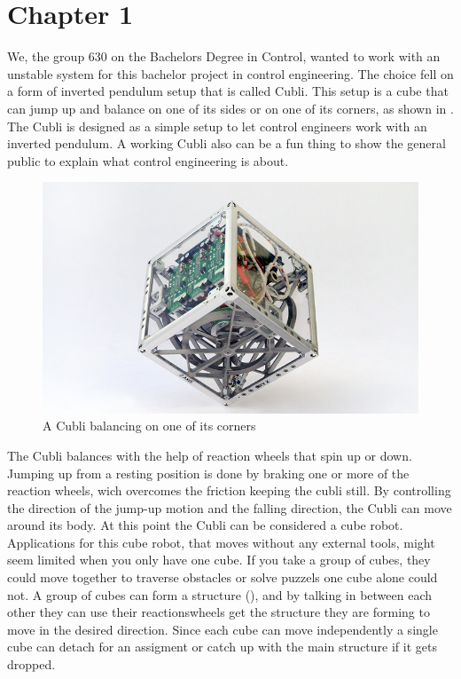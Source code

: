 \chapter{Chapter 1}
We, the group 630 on the Bachelors Degree in Control, wanted to work with an unstable system for this bachelor project in control engineering. The choice fell on a form of inverted pendulum setup that is called Cubli. This setup is a cube that can jump up and balance on one of its sides or on one of its corners, as shown in .
The Cubli is designed as a simple setup to let control engineers work with an inverted pendulum. A working Cubli also can be a fun thing to show the general public to explain what control engineering is about.  \cite{MGajamohan}

\begin{figure}[H] 
	\centering 
	\includegraphics[scale=1.3]{figures/CubliCorner-700x430}
	\caption{A Cubli balancing on one of its corners\cite{RAndrea}}
	\label{CubliCorner}
\end{figure} 
The Cubli balances with the help of reaction wheels that spin up or down. Jumping up from a resting position is done by braking one or more of the reaction wheels, wich overcomes the friction keeping the cubli still. 
By controlling the direction of the jump-up motion and the falling direction, the Cubli can move around its body. At this point the Cubli can be considered a cube robot.\\
Applications for this cube robot, that moves without any external tools, might seem limited when you only have one cube. If you take a group of cubes, they could move together to traverse obstacles or solve puzzels one cube alone could not. A group of cubes can form a structure (), and by talking in between each other they can use their reactionswheels get the structure they are forming to move in the desired direction. Since each cube can move independently a single cube can detach for an assigment or catch up with the main structure if it gets dropped.\cite{JRomanishin}

